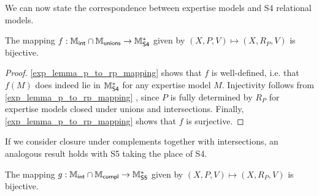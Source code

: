 We can now state the correspondence between expertise models and S4 relational
models.

\begin{theorem}
\label{exp_thm_s4_semantic_link}

    The mapping $f: \mathbb{M}_{\mathsf{int}} \cap \mathbb{M}_{\mathsf{unions}} \to \mathbb{M}^*_{\mathsf{S4}}$ given by $(X, P, V)
    \mapsto (X, R_P, V)$ is bijective.
\end{theorem}

\begin{proof}

    \cref{exp_lemma_p_to_rp_mapping}  shows that $f$ is
    well-defined, i.e. that $f(M)$ does indeed lie in $\mathbb{M}^*_{\mathsf{S4}}$ for any
    expertise model $M$. Injectivity follows from \cref{exp_lemma_p_to_rp_mapping}
    , since $P$ is fully determined by $R_P$ for
    expertise models closed under unions and intersections. Finally,
    \cref{exp_lemma_p_to_rp_mapping}  shows that $f$
    is surjective.
\end{proof}

If we consider closure under complements together with intersections, an
analogous result holds with S5 taking the place of S4.

\begin{theorem}
\label{exp_thm_s5_semantic_link}

    The mapping $g: \mathbb{M}_{\mathsf{int}} \cap \mathbb{M}_{\mathsf{compl}} \to \mathbb{M}^*_{\mathsf{S5}}$ given by $(X, P, V)
    \mapsto (X, R_P, V)$ is bijective.
\end{theorem}


